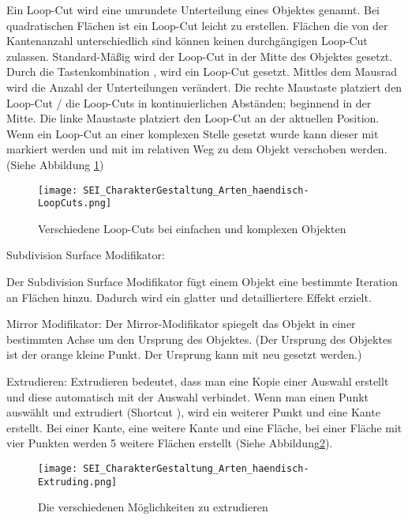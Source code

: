 Ein Loop-Cut wird eine umrundete Unterteilung eines Objektes genannt. Bei quadratischen Flächen ist ein Loop-Cut leicht
zu erstellen. Flächen die von der Kantenanzahl unterschiedlich sind können keinen durchgängigen Loop-Cut zulassen.
Standard-Mäßig wird der Loop-Cut in der Mitte des Objektes gesetzt. Durch die Tastenkombination ,
wird ein Loop-Cut gesetzt. Mittles dem Mausrad wird die Anzahl der Unterteilungen verändert. Die rechte Maustaste
platziert den Loop-Cut / die Loop-Cuts in kontinuierlichen Abständen; beginnend in der Mitte. Die linke Maustaste
platziert den Loop-Cut an der aktuellen Position. Wenn ein Loop-Cut an einer komplexen Stelle gesetzt wurde kann dieser
mit  markiert werden und mit  im relativen Weg zu dem Objekt verschoben werden.
(Siehe Abbildung \ref{picture:loop_cut_slide})

\begin{figure}[h]
    \centering
    \texttt{[image: SEI\_CharakterGestaltung\_Arten\_haendisch-LoopCuts.png]}
    \caption{Verschiedene Loop-Cuts bei einfachen und komplexen Objekten}
    \label{picture:loop_cut_slide}
\end{figure}


Subdivision Surface Modifikator\citep{blender:mod_subd}:

Der Subdivision Surface Modifikator fügt einem Objekt eine bestimmte Iteration an Flächen hinzu. Dadurch wird ein
glatter und detailliertere Effekt erzielt.


Mirror Modifikator\citep{blender:mod_mirror}:
Der Mirror-Modifikator spiegelt das Objekt in einer bestimmten Achse um den Ursprung des Objektes.
(Der Ursprung des Objektes ist der orange kleine Punkt. Der Ursprung kann mit  neu gesetzt werden.)

Extrudieren\citep{blender:extrude}:
Extrudieren bedeutet, dass man eine Kopie einer Auswahl erstellt und diese automatisch mit der Auswahl verbindet.
Wenn man einen Punkt auswählt und extrudiert (Shortcut ), wird ein weiterer Punkt und eine Kante erstellt.
Bei einer Kante, eine weitere Kante und eine Fläche, bei einer Fläche mit vier Punkten werden 5 weitere Flächen erstellt
(Siehe Abbildung\ref{picture:extrude}).

\begin{figure}[h]
    \centering
    \texttt{[image: SEI\_CharakterGestaltung\_Arten\_haendisch-Extruding.png]}
    \caption{Die verschiedenen Möglichkeiten zu extrudieren}
    \label{picture:extrude}
\end{figure}


